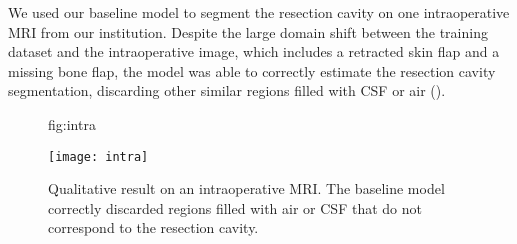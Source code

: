 We used our baseline model to segment the resection cavity on one intraoperative \ac{MRI} from our institution.
Despite the large domain shift between the training dataset and the intraoperative image, which includes a retracted skin flap and a missing bone flap, the model was able to correctly estimate the resection cavity segmentation, discarding other similar regions filled with \ac{CSF} or air ().

\begin{figure}
    \centering
    \floatconts
    {fig:intra}
    {\caption{%
        Qualitative result on an intraoperative \ac{MRI}.
        The baseline model correctly discarded regions filled with air or \ac{CSF} that do not correspond to the resection cavity.
    }}
    {
        \texttt{[image: intra]}
    }
\end{figure}